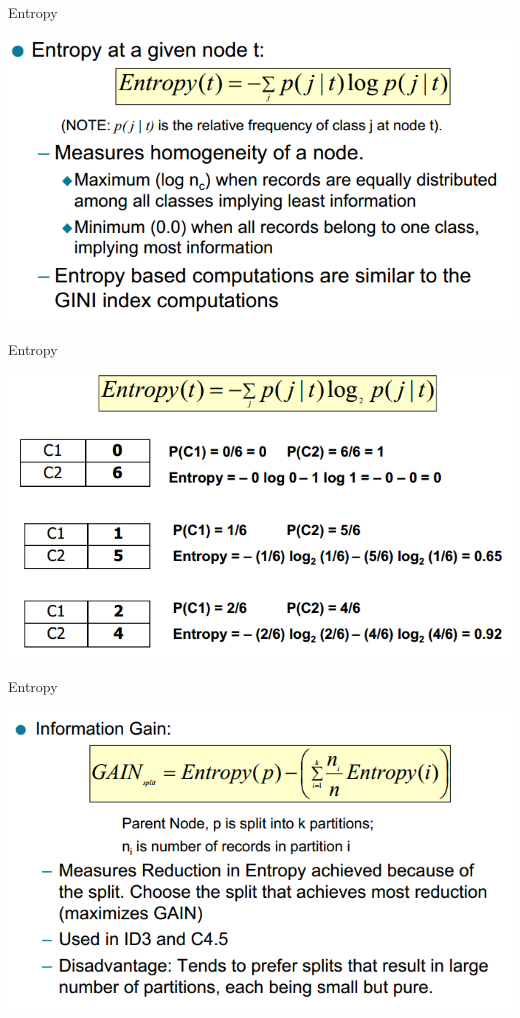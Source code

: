 \documentclass{beamer}
\begin{document}
\begin{frame}{Entropy}
    \begin{center}
        \includegraphics[scale=0.4]{entropy1.png}
    \end{center}
\end{frame}
\begin{frame}{Entropy}
    \begin{center}
        \includegraphics[scale=0.4]{entropy2.png}
    \end{center}
\end{frame}
\begin{frame}{Entropy}
    \begin{center}
        \includegraphics[scale=0.4]{entropy3.png}
    \end{center}
\end{frame}
\end{document}
